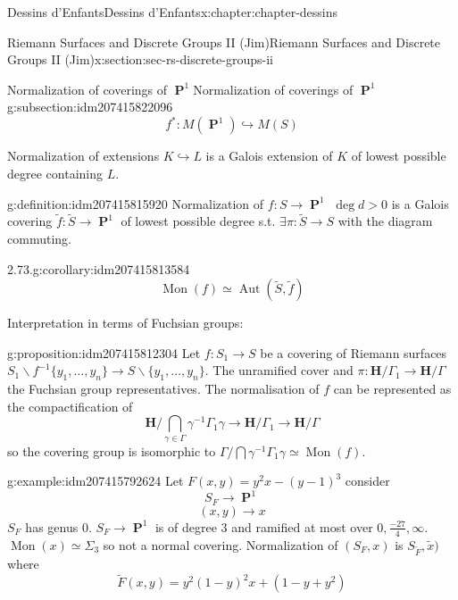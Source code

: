 \documentclass[oneside,10pt,]{book}
\numberwithin{equation}{section}
\newcommand{\inv}{^{-1}}
\newcommand{\HH}{\mathbf{H}}
\DeclareMathOperator{\PP}{\mathbf{P}}
\DeclareMathOperator{\Aut}{Aut}
\newcommand{\gt}{>}
\begin{document}
\begin{chapterptx}{Dessins d'Enfants}{}{Dessins d'Enfants}{}{}{x:chapter:chapter-dessins}
\begin{sectionptx}{Riemann Surfaces and Discrete Groups II (Jim)}{}{Riemann Surfaces and Discrete Groups II (Jim)}{}{}{x:section:sec-rs-discrete-groups-ii}
\begin{subsectionptx}{Normalization of coverings of \(\PP^1\)}{}{Normalization of coverings of \(\PP^1\)}{}{}{g:subsection:idm207415822096}
\begin{equation*}
f^* \colon M(\PP^1 ) \hookrightarrow M(S)
\end{equation*}
%
\par
Normalization of extensions \(K \hookrightarrow L\) is a Galois extension of \(K \) of lowest possible degree containing \(L\).%
\begin{definition}{}{g:definition:idm207415815920}%
Normalization of \(f\colon S\to \PP^1\) \(\deg d \gt 0 \) is a Galois covering \(\tilde f \colon \tilde S \to \PP^1 \) of  lowest possible degree s.t. \(\exists \pi \colon \tilde S \to S\) with  the diagram commuting.%
\end{definition}
\begin{corollary}{2.73.}{}{g:corollary:idm207415813584}%
%
\begin{equation*}
\operatorname{Mon}(f)  \simeq \Aut(\tilde S, \tilde f)
\end{equation*}
%
\end{corollary}
Interpretation in terms of Fuchsian groups:%
\begin{proposition}{}{}{g:proposition:idm207415812304}%
Let \(f\colon S_1 \to S\) be a covering of Riemann surfaces \(S_1\smallsetminus f\inv \{ y_1, \ldots, y_n \} \to S \smallsetminus\{ y_1, \ldots, y_n \}\). The unramified cover and \(\pi \colon \HH/ \Gamma_1 \to \HH/ \Gamma\) the Fuchsian group representatives. The normalisation of \(f\) can be represented as the compactification of%
\begin{equation*}
\HH/ \bigcap_{\gamma \in \Gamma} \gamma \inv \Gamma_1 \gamma \to \HH/\Gamma_1 \to \HH/\Gamma
\end{equation*}
so the covering group is isomorphic to \(\Gamma/ \bigcap \gamma \inv \Gamma_1 \gamma \simeq \operatorname{Mon}(f)\).%
\end{proposition}
\begin{example}{}{g:example:idm207415792624}%
Let \(F(x,y) = y^2x - (y-1)^3\) consider%
\begin{equation*}
S_F \to \PP^1
\end{equation*}
%
\begin{equation*}
(x,y) \to x
\end{equation*}
\(S_F\) has genus 0. \(S_F \to \PP^1\) is of degree 3 and ramified at most over \(0, \frac{-27}{4}, \infty\). \(\operatorname{Mon}(x)  \simeq \Sigma_3\) so not a normal covering. Normalization of \((S_F, x)\) is \(S_{\tilde F} , \tilde x)\) where%
\begin{equation*}
\tilde F (x,y) = y^2 ( 1-y)^2 x +  (1-y + y^2)

\end{equation*}
\end{example}
\end{subsectionptx}
\end{sectionptx}
\end{chapterptx}
\end{document}
